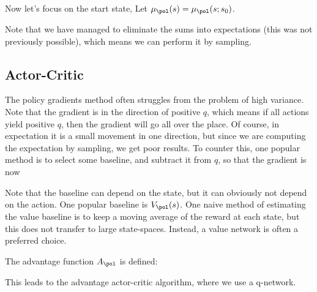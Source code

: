 \documentclass[12pt]{article}
\begin{document}

Now let's focus on the start state, Let $\mu_{\pol}(s) = \mu_{\pol}(s;s_0)$.


Note that we have managed to eliminate the sums into expectations (this was not previously possible), which means we can perform it by sampling.

\subsection{Actor-Critic}

The policy gradients method often struggles from the problem of high variance. Note that the gradient is in the direction of positive $q$, which means if all actions yield positive $q$, then the gradient will go all over the place. Of course, in expectation it is a small movement in one direction, but since we are computing the expectation by sampling, we get poor results. To counter this, one popular method is to select some baseline, and subtract it from $q$, so that the gradient is now


Note that the baseline can depend on the state, but it can obviously not depend on the action. One popular baseline is $V_{\pol}(s)$. One naive method of estimating the value baseline is to keep a moving average of the reward at each state, but this does not transfer to large state-spaces. Instead, a value network is often a preferred choice.

The advantage function $A_{\pol}$ is defined:


This leads to the advantage actor-critic algorithm, where we use a q-network.
\end{document}

